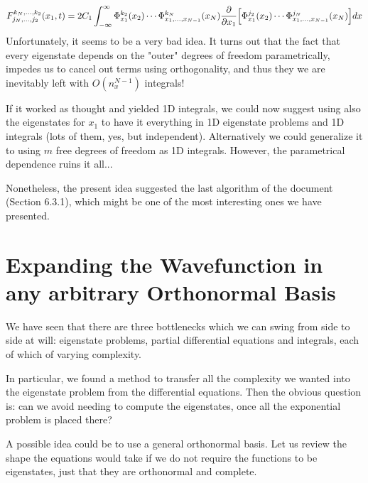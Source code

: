 \documentclass[11pt, a4paper]{article} %
\begin{document}
\begin{equation}
F^{k_N,...,k_2}_{j_N,...,j_2}(x_1,t)=2C_1\int_{-\infty}^{\infty}\Phi^{k_2}_{x_1}(x_2) \cdots \Phi^{k_N}_{x_1,... ,x_{N-1}}(x_N) \pdv{}{x_1}\qty[\Phi^{j_2}_{x_1}(x_2) \cdots \Phi^{j_N}_{x_1,... ,x_{N-1}}(x_N)]dx
\end{equation}
Unfortunately, it seems to be a very bad idea. It turns out that the fact that every eigenstate depends on the "outer" degrees of freedom parametrically, impedes us to cancel out terms using orthogonality, and thus they we are inevitably left with $O(n_x^{N-1})$ integrals!

If it worked as thought and yielded 1D integrals, we could now suggest using also the eigenstates for $x_1$ to have it everything in 1D eigenstate problems and 1D integrals (lots of them, yes, but independent). Alternatively we could generalize it to using $m$ free degrees of freedom as 1D integrals. However, the parametrical dependence ruins it all...

Nonetheless, the present idea suggested the last algorithm of the document (Section 6.3.1), which might be one of the most interesting ones we have presented.


\newpage
\section{Expanding the Wavefunction in any arbitrary Orthonormal Basis}
We have seen that there are three bottlenecks which we can swing from side to side at will: eigenstate problems, partial differential equations and integrals, each of which of varying complexity. 

In particular, we found a method to transfer all the complexity we wanted into the eigenstate problem from the differential equations. Then the obvious question is: can we avoid needing to compute the eigenstates, once all the exponential problem is placed there? 

A possible idea could be to use a general orthonormal basis. Let us review the shape the equations would take if we do not require the functions to be eigenstates, just that they are orthonormal and complete.
\end{document}
